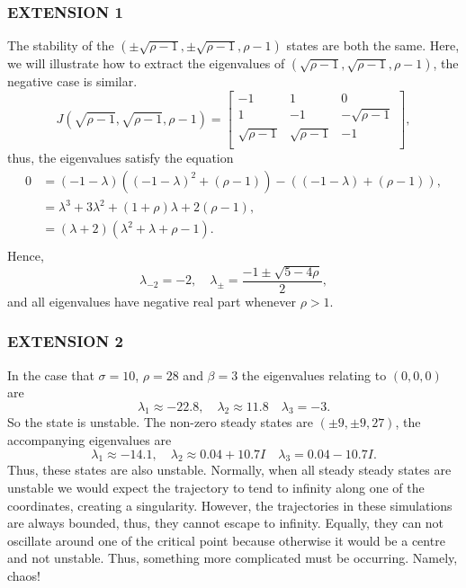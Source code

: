 \documentclass[]{article}
\newcommand{\bb}{\begin{equation}}
\newcommand{\ee}{\end{equation}}
\begin{document}
\begin{Answ}
\subsubsection{EXTENSION 1}
The stability of the $(\pm\sqrt{\rho-1},\pm\sqrt{\rho-1},\rho-1)$ states are both the same. Here, we will illustrate how to extract the eigenvalues of $(\sqrt{\rho-1},\sqrt{\rho-1},\rho-1)$, the negative case is similar.
\bb
J(\sqrt{\rho-1},\sqrt{\rho-1},\rho-1)=\left[ {\begin{array}{ccc}
   -1 & 1 & 0 \\
   1 & -1 & -\sqrt{\rho-1} \\
   \sqrt{\rho-1}  & \sqrt{\rho-1} & -1 \\
  \end{array} } \right],
\ee
thus, the eigenvalues satisfy the equation
\begin{align}
0&=(-1-\lambda)((-1-\lambda)^2+(\rho-1))-((-1-\lambda)+(\rho-1)),\\
&=\lambda^3+3\lambda^2+(1+\rho)\lambda+2(\rho-1),\\
&=(\lambda+2)(\lambda^2+\lambda+\rho-1).\\
\end{align}
Hence,
\bb
\lambda_{-2}=-2,\quad\lambda_{\pm}=\frac{-1\pm\sqrt{5-4\rho}}{2},
\ee
and all eigenvalues have negative real part whenever $\rho>1$.

\subsubsection{EXTENSION 2}
In the case that  $\sigma=10$, $\rho=28$ and $\beta=3$ the eigenvalues relating to $(0,0,0)$ are
\bb
\lambda_1\approx-22.8,\quad\lambda_2\approx 11.8\quad\lambda_3=-3.
\ee
So the state is unstable. The non-zero steady states are $(\pm9,\pm9,27)$, the accompanying eigenvalues are
\bb
\lambda_1\approx-14.1,\quad\lambda_2\approx 0.04+10.7I\quad\lambda_3=0.04-10.7I.
\ee
Thus, these states are also unstable. Normally, when all steady steady states are unstable we would expect the trajectory to tend to infinity along one of the coordinates, creating a singularity. However, the trajectories in these simulations are always bounded, thus, they cannot escape to infinity. Equally, they can not oscillate around one of the critical point because otherwise it would be a centre and not unstable. Thus, something more complicated must be occurring. Namely, chaos!
\end{Answ}
%
\end{document}

